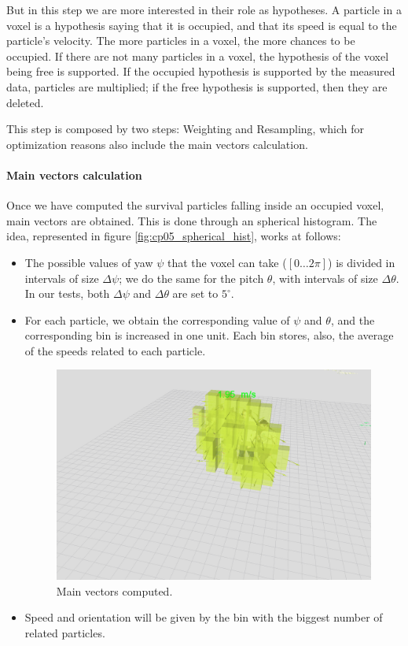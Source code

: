 But in this step we are more interested in their role as hypotheses. A particle in a voxel is a hypothesis saying that it is occupied, and that its speed is equal to the particle's velocity. The more particles in a voxel, the more chances to be occupied. If there are not many particles in a voxel, the hypothesis of the voxel being free is supported. If the occupied hypothesis is supported by the measured data, particles are multiplied; if the free hypothesis is supported, then they are deleted.

This step is composed by two steps: Weighting and Resampling, which for optimization reasons also include the main vectors calculation.

\paragraph{Main vectors calculation}\label{ch:chapter05_01_04_02_01}

Once we have computed the survival particles falling inside an occupied voxel, main vectors are obtained. This is done through an spherical histogram. The idea, represented in figure \ref{fig:cp05_spherical_hist}, works at follows:
\begin{itemize}
 \item The possible values of yaw $\psi$ that the voxel can take ($[0\dots2\pi]$) is divided in intervals of size $\Delta\psi$; we do the same for the pitch $\theta$, with intervals of size $\Delta\theta$. In our tests, both $\Delta\psi$ and $\Delta\theta$ are set to $5^{\circ}$.
 \item For each particle, we obtain the corresponding value of $\psi$ and $\theta$, and the corresponding bin is increased in one unit. Each bin stores, also, the average of the speeds related to each particle.

 \begin{figure}[h!]
  \centering
  \includegraphics{obstacleSpeed}
  \caption{Main vectors computed.}\label{fig:cp05_main_vectors_per_voxel}
\end{figure}
 \item Speed and orientation will be given by the bin with the biggest number of related particles.
\end{itemize}


